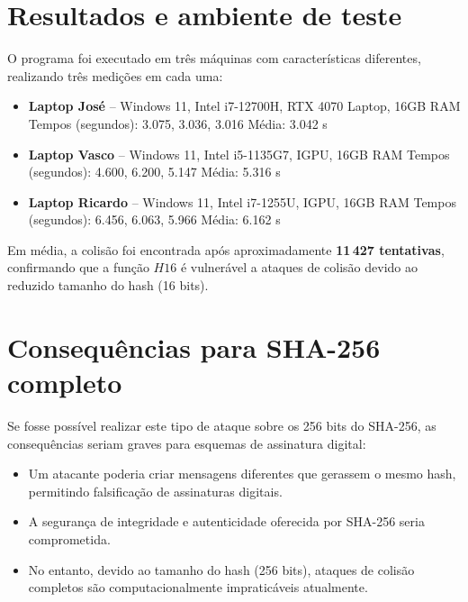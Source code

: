 \section{Resultados e ambiente de teste}

O programa foi executado em três máquinas com características diferentes, realizando três medições em cada uma:

\begin{itemize}
    \item \textbf{Laptop José} -- Windows 11, Intel i7-12700H, RTX 4070 Laptop, 16GB RAM  
    Tempos (segundos): 3.075, 3.036, 3.016  
    Média: 3.042 s
    \item \textbf{Laptop Vasco} -- Windows 11, Intel i5-1135G7, IGPU, 16GB RAM  
    Tempos (segundos): 4.600, 6.200, 5.147  
    Média: 5.316 s
    \item \textbf{Laptop Ricardo} -- Windows 11, Intel i7-1255U, IGPU, 16GB RAM  
    Tempos (segundos): 6.456, 6.063, 5.966  
    Média: 6.162 s
\end{itemize}

Em média, a colisão foi encontrada após aproximadamente \textbf{11\,427 tentativas}, confirmando que a função \(H16\) é vulnerável a ataques de colisão devido ao reduzido tamanho do hash (16 bits).

\section{Consequências para SHA-256 completo}

Se fosse possível realizar este tipo de ataque sobre os 256 bits do SHA-256, as consequências seriam graves para esquemas de assinatura digital:

\begin{itemize}
    \item Um atacante poderia criar mensagens diferentes que gerassem o mesmo hash, permitindo falsificação de assinaturas digitais.
    \item A segurança de integridade e autenticidade oferecida por SHA-256 seria comprometida.
    \item No entanto, devido ao tamanho do hash (256 bits), ataques de colisão completos são computacionalmente impraticáveis atualmente.
\end{itemize}